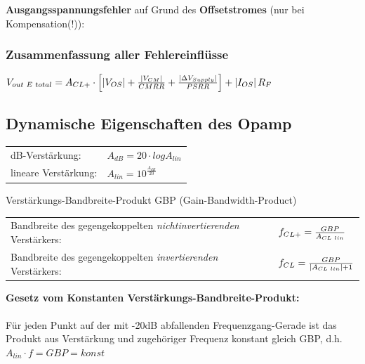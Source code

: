 			\begin{minipage}{18cm}
            	\vspace{3mm}
				\textbf{Ausgangsspannungsfehler} auf Grund des \textbf{Offsetstromes} (nur bei
				Kompensation(!)):
				\\
			\end{minipage}

		\subsubsection{Zusammenfassung aller Fehlereinflüsse}
      $V_{out\hspace{1mm}E\hspace{1mm}total}=A_{CL+}\cdot\left[\left|V_{OS}\right|+\frac{\left|V_{CM}\right|}{CMRR}
            	+\frac{\left|\Delta V_{Supply}\right|}{PSRR}\right]+\left|I_{OS}\right|R_F$\\

		\subsection{Dynamische Eigenschaften des Opamp}
			\begin{tabular}{ll}
				dB-Verstärkung:&
        $A_{dB}=20 \cdot log A_{lin}$\\
        lineare Verstärkung:&
        $A_{lin}=10^{\frac{A_{dB}}{20}}$\\
			\end{tabular}
      Verstärkungs-Bandbreite-Produkt GBP (Gain-Bandwidth-Product)\\
      \begin{tabular}{ll}
        Bandbreite des gegengekoppelten {\it nichtinvertierenden} Verstärkers:&
        $f_{CL+}=\frac{GBP}{A_{CL \hspace{1mm}lin}}$\\
        Bandbreite des gegengekoppelten {\it invertierenden} Verstärkers: &
        $f_{CL}=\frac{GBP}{\left| A_{CL \hspace{1mm}lin}\right|+1}$\\
      \end{tabular}
      {\bf Gesetz vom Konstanten Verstärkungs-Bandbreite-Produkt:} \\ \\
      	Für jeden Punkt auf der mit -20dB abfallenden Frequenzgang-Gerade ist das
        Produkt aus Verstärkung und zugehöriger Frequenz konstant gleich GBP, d.h. $A_{lin}\cdot f=GBP=konst$\\
      
